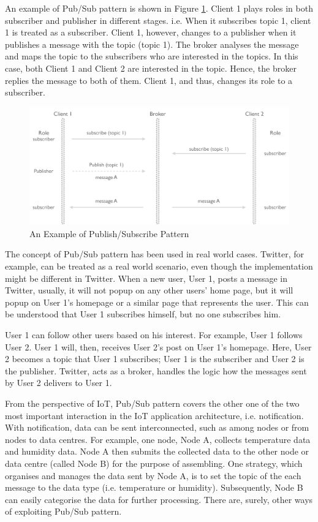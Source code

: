 An example of Pub/Sub pattern is shown in Figure \ref{fig:publish-subscribe-pattern}. Client 1 plays roles in both subscriber and publisher in different stages. i.e. When it subscribes topic 1, client 1 is treated as a subscriber. Client 1, however, changes to a publisher when it publishes a message with the topic (topic 1). The broker analyses the message and maps the topic to the subscribers who are interested in the topics. In this case, both Client 1 and Client 2 are interested in the topic. Hence, the broker replies the message to both of them. Client 1, and thus, changes its role to a subscriber.

\begin{figure}[ht]
  \begin{center}
    \includegraphics[width=1\textwidth]{images/publish-subscribe-pattern.pdf}
    \caption{An Example of Publish/Subscribe Pattern}
    \label{fig:publish-subscribe-pattern}
  \end{center}
\end{figure}

The concept of Pub/Sub pattern has been used in real world cases. Twitter, for example, can be treated as a real world scenario, even though the implementation might be different in Twitter. When a new user, User 1, posts a message in Twitter, usually, it will not popup on any other users' home page, but it will popup on User 1's homepage or a similar page that represents the user. This can be understood that User 1 subscribes himself, but no one subscribes him. 

User 1 can follow other users based on his interest. For example, User 1 follows User 2. User 1 will, then, receives User 2's post on User 1's homepage. Here, User 2 becomes a topic that User 1 subscribes; User 1 is the subscriber and User 2 is the publisher. Twitter, acts as a broker, handles the logic how the messages sent by User 2 delivers to User 1.

From the perspective of IoT, Pub/Sub pattern covers the other one of the two most important interaction in the IoT application architecture, i.e. notification. With notification, data can be sent interconnected, such as among nodes or from nodes to data centres. For example, one node, Node A, collects temperature data and humidity data. Node A then submits the collected data to the other node or data centre (called Node B) for the purpose of assembling. One strategy, which organises and manages the data sent by Node A, is to set the topic of the each message to the data type (i.e. temperature or humidity). Subsequently, Node B can easily categorise the data for further processing. There are, surely, other ways of exploiting Pub/Sub pattern. 

